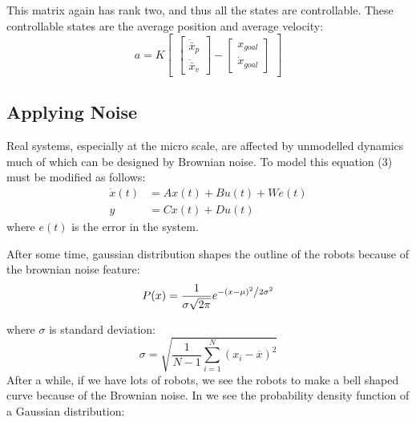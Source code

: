\documentclass[letterpaper, 10 pt, conference]{ieeeconf}
\begin{document}
This matrix again  has rank two, and thus all the states are controllable. These controllable states are the average position and average velocity:
\begin{equation}
a = K\begin{bmatrix}
\begin{bmatrix}
\dot{\bar{x}}_p \\
\dot{\bar{x}}_v
\end{bmatrix}
-
\begin{bmatrix}
x_{goal} \\
\dot{x}_{goal}
\end{bmatrix}
\end{bmatrix}
\end{equation}

\subsection{Applying Noise}
Real systems, especially at the micro scale, are affected by unmodelled dynamics much of which can be designed by Brownian noise. To model this equation (3) must be modified as follows:
\begin{align}
\dot{x}(t)  &=  A x(t) + B u(t) + We(t)\\
y &= C x(t) + D u(t)\nonumber
\end{align}
where $e(t)$ is the error in the system.

After some time, gaussian distribution shapes the outline of the robots because of the brownian noise feature:\\
\begin{equation}
P(x) = \frac{1}{{\sigma \sqrt {2\pi } }}e^{{{ - \left( {x - \mu } \right)^2 } \mathord{\left/ {\vphantom {{ - \left( {x - \mu } \right)^2 } {2\sigma ^2 }}} \right. \kern-\nulldelimiterspace} {2\sigma ^2 }}}
\end{equation}

where $\sigma$ is standard deviation:
\begin{equation}
\sigma = \sqrt{\frac{1}{N-1} \sum_{i=1}^N (x_i - \overline{x})^2}
\end{equation}
After a while, if we have lots of robots, we see the robots to make a bell shaped curve because of the Brownian noise. In we see the probability density function of a Gaussian distribution:\\
\end{document}
